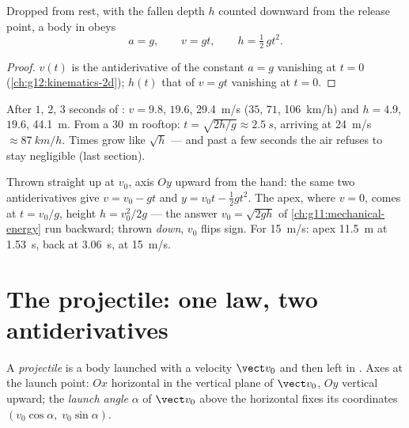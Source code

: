 \begin{proposition}\label{prop:g12:projectile-motion:vertical}
Dropped from rest, with the fallen depth $h$ counted downward from the
release point, a body in  obeys
\[
a = g, \qquad v = g t, \qquad h = \tfrac12\, g t^2 .
\]
\end{proposition}

\begin{proof}
$v(t)$ is the antiderivative of the constant $a = g$ vanishing at $t = 0$
(\cref{ch:g12:kinematics-2d}); $h(t)$ that of $v = gt$ vanishing at $t = 0$.
\end{proof}

\begin{example}\label{ex:g12:projectile-motion:orders}
After $1$, $2$, $3$ seconds of : $v = 9.8$, $19.6$, \qty{29.4}{m/s}
($35$, $71$, \qty{106}{km/h}) and $h = 4.9$, $19.6$, \qty{44.1}{m}. From a
\qty{30}{m} rooftop: $t = \sqrt{2h/g} \approx \qty{2.5}{s}$, arriving at
\qty{24}{m/s} $\approx \qty{87}{km/h}$. Times grow like $\sqrt h$ --- and
past a few seconds the air refuses to stay negligible (last section).
\end{example}

\begin{example}\label{ex:g12:projectile-motion:throw}
Thrown straight up at $v_0$, axis $Oy$ upward from the hand: the same two
antiderivatives give $v = v_0 - gt$ and $y = v_0 t - \tfrac12 gt^2$. The
apex, where $v = 0$, comes at $t = v_0/g$, height $h = v_0^2/2g$ --- the
 answer $v_0 = \sqrt{2gh}$ of \cref{ch:g11:mechanical-energy} run
backward; thrown \emph{down}, $v_0$ flips sign. For \qty{15}{m/s}: apex
\qty{11.5}{m} at \qty{1.53}{s}, back at \qty{3.06}{s}, at \qty{15}{m/s}.
\end{example}

\section{The projectile: one law, two antiderivatives}

\begin{definition}[Projectile]\label{def:g12:projectile-motion:projectile}
A \emph{projectile} is a body launched with a velocity
$\vect v_0$ and then left in . Axes at the launch point: $Ox$
horizontal in the vertical plane of $\vect v_0$, $Oy$ vertical upward; the
\emph{launch angle} $\alpha$ of $\vect v_0$ above the
horizontal fixes its coordinates $(v_0\cos\alpha,\; v_0\sin\alpha)$.
\end{definition}

